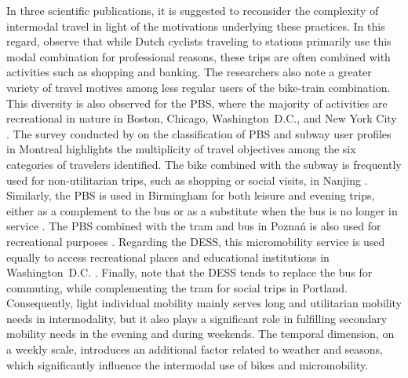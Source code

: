 \begin{refsegment}
In three scientific publications, it is suggested to reconsider the complexity of intermodal travel in light of the motivations underlying these practices. In this regard, \textcolor{blue}{\textcite[9]{jonkeren_bicycle_2021}} observe that while Dutch cyclists traveling to stations primarily use this modal combination for professional reasons, these trips are often combined with activities such as shopping and banking. The researchers also note a greater variety of travel motives among less regular users of the bike-train combination. This diversity is also observed for the \acrshort{PBS}, where the majority of activities are recreational in nature in Boston, Chicago, Washington~D.C., and New York City \textcolor{blue}{\autocite[10]{kong_deciphering_2020}}. The survey conducted by \textcolor{blue}{\textcite[479]{tarpin-pitre_typology_2020}} on the classification of \acrshort{PBS} and subway user profiles in Montreal highlights the multiplicity of travel objectives among the six categories of travelers identified. The bike combined with the subway is frequently used for non-utilitarian trips, such as shopping or social visits, in Nanjing \textcolor{blue}{\autocite[133]{chen_determinants_2012}}. Similarly, the \acrshort{PBS} is used in Birmingham for both leisure and evening trips, either as a complement to the bus or as a substitute when the bus is no longer in service \textcolor{blue}{\autocite[6]{glass_role_2020}}. The \acrshort{PBS} combined with the tram and bus in Poznań is also used for recreational purposes \textcolor{blue}{\autocite[197]{radzimski_exploring_2021}}. Regarding the \acrshort{DESS}, this micromobility service is used equally to access recreational places and educational institutions in Washington~D.C. \textcolor{blue}{\autocite[9]{ma_connecting_2022}}. Finally, \textcolor{blue}{\textcite[411]{mcqueen_assessing_2022}} note that the \acrshort{DESS} tends to replace the bus for commuting, while complementing the tram for social trips in Portland. Consequently, light individual mobility mainly serves long and utilitarian mobility needs in intermodality, but it also plays a significant role in fulfilling secondary mobility needs in the evening and during weekends. The temporal dimension, on a weekly scale, introduces an additional factor related to weather and seasons, which significantly influence the intermodal use of bikes and micromobility.%


\end{refsegment}
